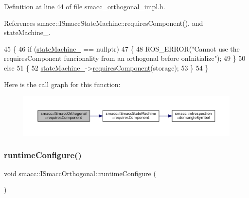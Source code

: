 Definition at line 44 of file smacc\+\_\+orthogonal\+\_\+impl.\+h.



References smacc\+::\+I\+Smacc\+State\+Machine\+::requires\+Component(), and state\+Machine\+\_\+.


\begin{DoxyCode}
45 \{
46     \textcolor{keywordflow}{if} (\hyperlink{classsmacc_1_1ISmaccOrthogonal_a418b2e094a65013444ec1fca7e94f28d}{stateMachine\_} == \textcolor{keyword}{nullptr})
47     \{
48         ROS\_ERROR(\textcolor{stringliteral}{"Cannot use the requiresComponent funcionality from an orthogonal before onInitialize"});
49     \}
50     \textcolor{keywordflow}{else}
51     \{
52         \hyperlink{classsmacc_1_1ISmaccOrthogonal_a418b2e094a65013444ec1fca7e94f28d}{stateMachine\_}->\hyperlink{classsmacc_1_1ISmaccStateMachine_aa6b25e28f3bce24c4b356dc865a9eb7b}{requiresComponent}(storage);
53     \}
54 \}
\end{DoxyCode}
Here is the call graph for this function\+:
\nopagebreak
\begin{figure}[H]
\begin{center}
\leavevmode
\includegraphics[width=350pt]{classsmacc_1_1ISmaccOrthogonal_a3f66cf4680e3026a6789769c8ea1aa83_cgraph}
\end{center}
\end{figure}
\mbox{\label{classsmacc_1_1ISmaccOrthogonal_a47ae4af0f05ea31cc98b4e1d792d1126}} 
\subsubsection{\texorpdfstring{runtime\+Configure()}{runtimeConfigure()}}
{\footnotesize\ttfamily void smacc\+::\+I\+Smacc\+Orthogonal\+::runtime\+Configure (\begin{DoxyParamCaption}{ }\end{DoxyParamCaption})}



